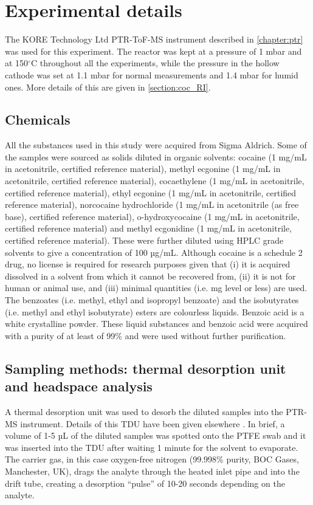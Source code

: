  
\section{Experimental details}
The KORE Technology Ltd PTR-ToF-MS instrument described in \autoref{chapter:ptr} was used for this experiment. 
The reactor was kept at a pressure of 1 mbar and at 150$^\circ$C throughout all the experiments, while the pressure in the hollow cathode was set at 1.1 mbar for normal measurements and 1.4 mbar for humid ones. More details of this are given in \autoref{section:coc_RI}.


\subsection{Chemicals}
All the substances used in this study were acquired from Sigma Aldrich. Some of the samples were sourced as solids diluted in organic solvents: cocaine (1 mg/mL in acetonitrile, certified reference material), methyl ecgonine (1 mg/mL in acetonitrile, certified reference material), cocaethylene (1 mg/mL in acetonitrile, certified reference material), ethyl ecgonine (1 mg/mL in acetonitrile, certified reference material), norcocaine hydrochloride (1 mg/mL in acetonitrile (as free base), certified reference material), o-hydroxycocaine (1 mg/mL in acetonitrile, certified reference material) and methyl ecgonidine (1 mg/mL in acetonitrile, certified reference material). These were further diluted using HPLC grade solvents to give a concentration of 100 µg/mL. Although cocaine is a schedule 2 drug, no license is required for research purposes given that (i) it is acquired dissolved in a solvent from which it cannot be recovered from, (ii) it is not for human or animal use, and (iii) minimal quantities (i.e. mg level or less) are used.
The benzoates (i.e. methyl, ethyl and isopropyl benzoate) and the isobutyrates (i.e. methyl and ethyl isobutyrate) esters are colourless liquids. Benzoic acid is a white crystalline powder. These liquid substances and benzoic acid were acquired with a purity of at least of 99\% and were used without further purification.



\subsection{Sampling methods: thermal desorption unit and headspace analysis}
A thermal desorption unit was used to desorb the diluted samples into the PTR-MS instrument. Details of this TDU have been given elsewhere \cite{RN445}. In brief, a volume of 1-5 µL of the diluted samples was spotted onto the PTFE swab and it was inserted into the TDU after waiting 1 minute for the solvent to evaporate. The carrier gas, in this case oxygen-free nitrogen (99.998\% purity, BOC Gases, Manchester, UK), drags the analyte through the heated inlet pipe and into the drift tube, creating a desorption “pulse” of 10-20 seconds depending on the analyte.

